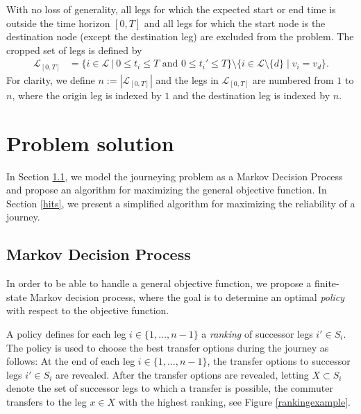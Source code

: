 \documentclass[dissertation,draft*]{aaltoseries}
\begin{document}
With no loss of generality, all legs for
which the expected start or end time is outside the time horizon $[0,T]$ and 
all legs for which the start node is the destination node (except the destination leg)
are excluded from the problem.
The cropped set of legs is defined by 
\begin{align*}
\mathcal{L}_{[0,T]} & = \{i \in \mathcal{L} \ | \ 0 \leq t_i \leq T \mbox{ and } 0 \leq t_i' \leq T \} 
\setminus \{i \in \mathcal{L} \setminus \{d\} \mid v_i = v_d\}.  
\end{align*}
For clarity, we define $n:=|\mathcal{L}_{[0,T]}|$ and the legs in $\mathcal{L}_{[0,T]}$ 
are numbered from $1$ to $n$, where the origin leg is indexed by $1$ and the destination leg is indexed by $n$.

\section{Problem solution}
In Section \ref{mdp}, we model the journeying problem as a Markov Decision Process and propose an algorithm 
for maximizing the general objective function.
In Section \ref{hits}, we present a simplified algorithm for maximizing the reliability of a journey.

\subsection{Markov Decision Process}
\label{mdp}
In order to be able to handle a general objective function,
we propose a finite-state Markov decision process, %
where the goal is to determine an optimal \emph{policy} with respect to the objective function. 

A policy defines for each leg $i \in \{1,\ldots,n-1\}$ a \emph{ranking} of successor 
legs $i' \in S_i$. 
The policy is used to choose the best transfer options during the journey as follows:
At the end of each leg $i \in \{1,\ldots,n-1\}$, the transfer options to successor legs $i' \in S_i$ are revealed. 
After the transfer options are revealed, letting $X \subset S_i$ denote the 
set of successor legs to which a transfer is possible, the commuter transfers to the 
leg $x \in X$ with the highest ranking, see Figure \ref{rankingexample}.
\end{document}
